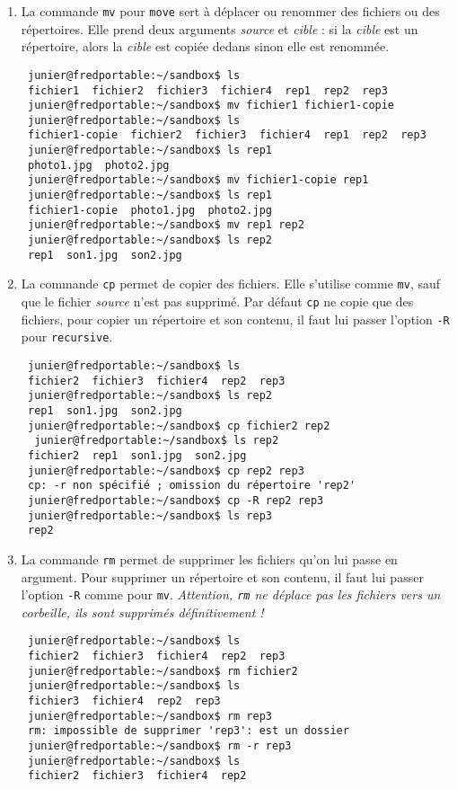 \documentclass[
  11pt,
]{article}
\newcounter{def}
\begin{document}
\begin{enumerate}
\def\labelenumi{\arabic{enumi}.}
\item
  La commande \texttt{mv} pour \texttt{move} sert à déplacer ou renommer
  des fichiers ou des répertoires. Elle prend deux arguments
  \emph{source} et \emph{cible} : si la \emph{cible} est un répertoire,
  alors la \emph{cible} est copiée dedans sinon elle est renommée.

\begin{verbatim}
 junier@fredportable:~/sandbox$ ls
 fichier1  fichier2  fichier3  fichier4  rep1  rep2  rep3
 junier@fredportable:~/sandbox$ mv fichier1 fichier1-copie
 junier@fredportable:~/sandbox$ ls
 fichier1-copie  fichier2  fichier3  fichier4  rep1  rep2  rep3
 junier@fredportable:~/sandbox$ ls rep1
 photo1.jpg  photo2.jpg
 junier@fredportable:~/sandbox$ mv fichier1-copie rep1
 junier@fredportable:~/sandbox$ ls rep1
 fichier1-copie  photo1.jpg  photo2.jpg
 junier@fredportable:~/sandbox$ mv rep1 rep2
 junier@fredportable:~/sandbox$ ls rep2
 rep1  son1.jpg  son2.jpg
\end{verbatim}
\item
  La commande \texttt{cp} permet de copier des fichiers. Elle s'utilise
  comme \texttt{mv}, sauf que le fichier \emph{source} n'est pas
  supprimé. Par défaut \texttt{cp} ne copie que des fichiers, pour
  copier un répertoire et son contenu, il faut lui passer l'option
  \texttt{-R} pour \texttt{recursive}.

\begin{verbatim}
 junier@fredportable:~/sandbox$ ls
 fichier2  fichier3  fichier4  rep2  rep3
 junier@fredportable:~/sandbox$ ls rep2
 rep1  son1.jpg  son2.jpg
 junier@fredportable:~/sandbox$ cp fichier2 rep2
  junier@fredportable:~/sandbox$ ls rep2
 fichier2  rep1  son1.jpg  son2.jpg
 junier@fredportable:~/sandbox$ cp rep2 rep3
 cp: -r non spécifié ; omission du répertoire 'rep2'
 junier@fredportable:~/sandbox$ cp -R rep2 rep3
 junier@fredportable:~/sandbox$ ls rep3
 rep2
\end{verbatim}
\item
  La commande \texttt{rm} permet de supprimer les fichiers qu'on lui
  passe en argument. Pour supprimer un répertoire et son contenu, il
  faut lui passer l'option \texttt{-R} comme pour \texttt{mv}.
  \emph{Attention, \texttt{rm} ne déplace pas les fichiers vers un
  corbeille, ils sont supprimés définitivement !}

\begin{verbatim}
 junier@fredportable:~/sandbox$ ls
 fichier2  fichier3  fichier4  rep2  rep3
 junier@fredportable:~/sandbox$ rm fichier2
 junier@fredportable:~/sandbox$ ls
 fichier3  fichier4  rep2  rep3
 junier@fredportable:~/sandbox$ rm rep3
 rm: impossible de supprimer 'rep3': est un dossier
 junier@fredportable:~/sandbox$ rm -r rep3
 junier@fredportable:~/sandbox$ ls
 fichier2  fichier3  fichier4  rep2
\end{verbatim}
\end{enumerate}
\end{document}
